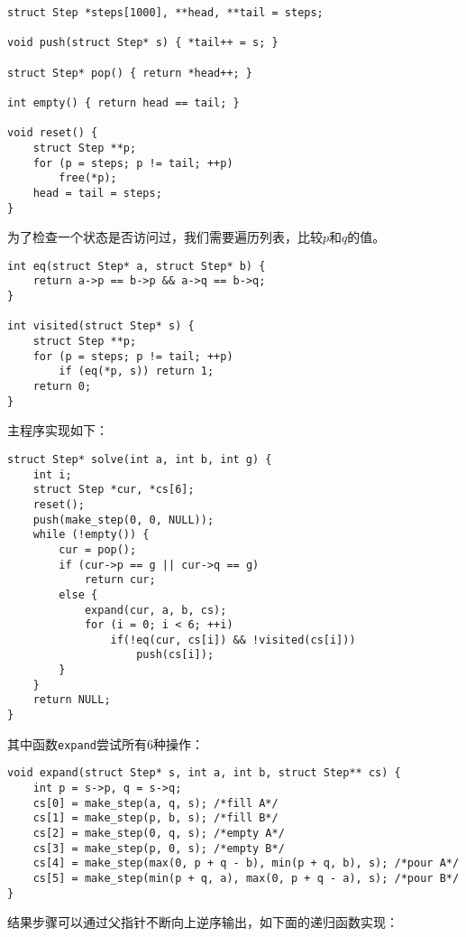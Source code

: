 \documentclass[UTF8]{article}
\begin{document}
\lstset{language=C}
\begin{lstlisting}
struct Step *steps[1000], **head, **tail = steps;

void push(struct Step* s) { *tail++ = s; }

struct Step* pop() { return *head++; }

int empty() { return head == tail; }

void reset() {
    struct Step **p;
    for (p = steps; p != tail; ++p)
        free(*p);
    head = tail = steps;
}
\end{lstlisting}

为了检查一个状态是否访问过，我们需要遍历列表，比较$p$和$q$的值。

\lstset{language=C}
\begin{lstlisting}
int eq(struct Step* a, struct Step* b) {
    return a->p == b->p && a->q == b->q;
}

int visited(struct Step* s) {
    struct Step **p;
    for (p = steps; p != tail; ++p)
        if (eq(*p, s)) return 1;
    return 0;
}
\end{lstlisting}

主程序实现如下：

\lstset{language=C}
\begin{lstlisting}
struct Step* solve(int a, int b, int g) {
    int i;
    struct Step *cur, *cs[6];
    reset();
    push(make_step(0, 0, NULL));
    while (!empty()) {
        cur = pop();
        if (cur->p == g || cur->q == g)
            return cur;
        else {
            expand(cur, a, b, cs);
            for (i = 0; i < 6; ++i)
                if(!eq(cur, cs[i]) && !visited(cs[i]))
                    push(cs[i]);
        }
    }
    return NULL;
}
\end{lstlisting}

其中函数\texttt{expand}尝试所有6种操作：

\lstset{language=C}
\begin{lstlisting}
void expand(struct Step* s, int a, int b, struct Step** cs) {
    int p = s->p, q = s->q;
    cs[0] = make_step(a, q, s); /*fill A*/
    cs[1] = make_step(p, b, s); /*fill B*/
    cs[2] = make_step(0, q, s); /*empty A*/
    cs[3] = make_step(p, 0, s); /*empty B*/
    cs[4] = make_step(max(0, p + q - b), min(p + q, b), s); /*pour A*/
    cs[5] = make_step(min(p + q, a), max(0, p + q - a), s); /*pour B*/
}
\end{lstlisting}

结果步骤可以通过父指针不断向上逆序输出，如下面的递归函数实现：
\end{document}
